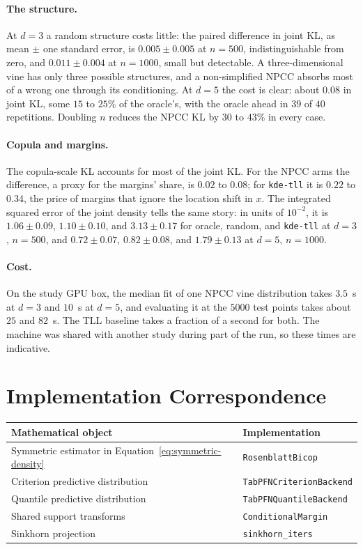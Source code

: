 \documentclass[11pt]{article}
\begin{document}
\paragraph{The structure.} At $d=3$ a random structure costs little: the
paired difference in joint KL, as mean $\pm$ one standard error, is
$0.005 \pm 0.005$ at $n=500$,
indistinguishable from zero, and $0.011 \pm 0.004$ at $n=1000$, small but
detectable. A three-dimensional vine has only three possible structures,
and a non-simplified NPCC absorbs most of a wrong one through its
conditioning. At $d=5$ the cost is clear: about $0.08$ in joint KL, some
$15$ to $25\%$ of the oracle's, with the oracle ahead in $39$ of $40$
repetitions. Doubling $n$ reduces the NPCC KL by $30$ to $43\%$ in every
case.

\paragraph{Copula and margins.} The copula-scale KL accounts for most of
the joint KL. For the NPCC arms the difference, a proxy for the margins'
share, is $0.02$ to $0.08$; for \texttt{kde-tll} it is $0.22$ to $0.34$,
the price of margins that ignore the location shift in $x$. The
integrated squared error of the joint density tells the same story: in
units of $10^{-2}$, it is $1.06 \pm 0.09$, $1.10 \pm 0.10$, and
$3.13 \pm 0.17$ for oracle, random, and \texttt{kde-tll} at $d=3$,
$n=500$, and $0.72 \pm 0.07$, $0.82 \pm 0.08$, and $1.79 \pm 0.13$ at
$d=5$, $n=1000$.

\paragraph{Cost.} On the study GPU box, the median fit of one NPCC vine
distribution takes $3.5$~s at $d=3$ and $10$~s at $d=5$, and evaluating it
at the $5000$ test points takes about $25$ and $82$~s. The TLL baseline
takes a fraction of a second for both. The machine was shared with another
study during part of the run, so these times are indicative.

\section{Implementation Correspondence}

\begin{table}[h]
  \centering
  \begin{tabular}{ll}
    \toprule
    Mathematical object & Implementation \\
    \midrule
    Symmetric estimator in Equation~\eqref{eq:symmetric-density}
      & \texttt{RosenblattBicop} \\
    Criterion predictive distribution
      & \texttt{TabPFNCriterionBackend} \\
    Quantile predictive distribution
      & \texttt{TabPFNQuantileBackend} \\
    Shared support transforms
      & \texttt{ConditionalMargin} \\
    Sinkhorn projection
      & \texttt{sinkhorn\_iters} \\
    \bottomrule
  \end{tabular}
\end{table}
\end{document}
